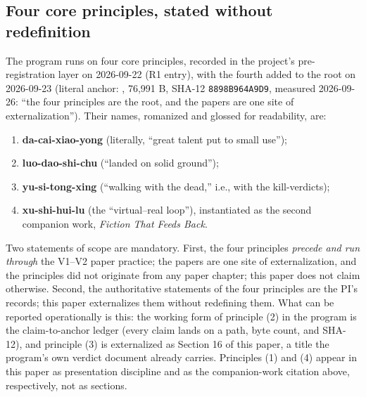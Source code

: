 \documentclass[11pt]{article}
\newcommand{\sha}[1]{\texttt{#1}}
\begin{document}
\subsection{Four core principles, stated without redefinition}
\noindent The program runs on four core principles, recorded in the project's pre-registration layer on 2026-09-22 (R1 entry), with the fourth added to the root on 2026-09-23 (literal anchor: , 76,991 B, SHA-12 \sha{8898B964A9D9}, measured 2026-09-26: ``the four principles are the root, and the papers are one site of externalization''). Their names, romanized and glossed for readability, are:\par
\begin{enumerate}[leftmargin=1.9em,itemsep=2pt,parsep=0pt,topsep=3pt]
\item \textbf{da-cai-xiao-yong} (literally, ``great talent put to small use'');
\item \textbf{luo-dao-shi-chu} (``landed on solid ground'');
\item \textbf{yu-si-tong-xing} (``walking with the dead,'' i.e., with the kill-verdicts);
\item \textbf{xu-shi-hui-lu} (the ``virtual–real loop''), instantiated as the second companion work, \emph{Fiction That Feeds Back}.
\end{enumerate}
\noindent Two statements of scope are mandatory. First, the four principles \emph{precede and run through} the V1–V2 paper practice; the papers are one site of externalization, and the principles did not originate from any paper chapter; this paper does not claim otherwise. Second, the authoritative statements of the four principles are the PI's records; this paper externalizes them without redefining them. What can be reported operationally is this: the working form of principle (2) in the program is the claim-to-anchor ledger (every claim lands on a path, byte count, and SHA-12), and principle (3) is externalized as Section 16 of this paper, a title the program's own verdict document already carries. Principles (1) and (4) appear in this paper as presentation discipline and as the companion-work citation above, respectively, not as sections.\par
\end{document}
